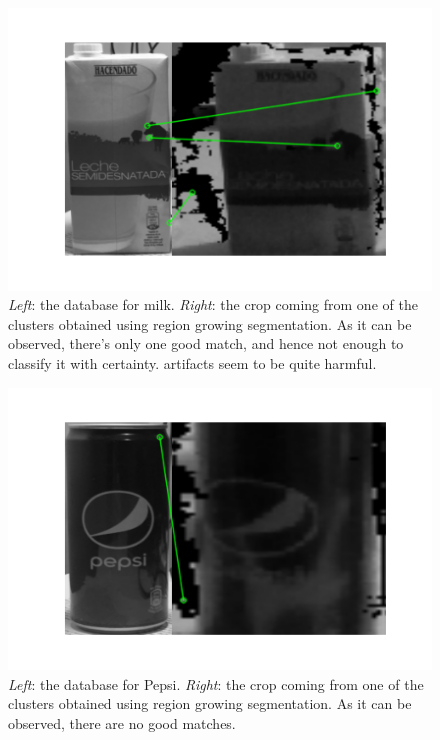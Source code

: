 \documentclass[../main.tex]{subfiles}
\begin{document}
\begin{figure}[H]
    \centering
    \includegraphics[width=0.7\linewidth]{images/sift_milk_crop.png}
    \caption{\emph{Left}: the database for milk. \emph{Right}: the crop coming from one of the clusters obtained using region growing segmentation. As it can be observed, there's only one good match, and hence not enough to classify it with certainty. artifacts seem to be quite harmful.}
    \label{fig:sift_milk_crop}
\end{figure}

\begin{figure}[H]
    \centering
    \includegraphics[width=0.7\linewidth]{images/sift_pepsi_crop.png}
    \caption{\emph{Left}: the database for Pepsi. \emph{Right}: the crop coming from one of the clusters obtained using region growing segmentation. As it can be observed, there are no good matches.}
    \label{fig:sift_pepsi_crop}
\end{figure}
\end{document}
